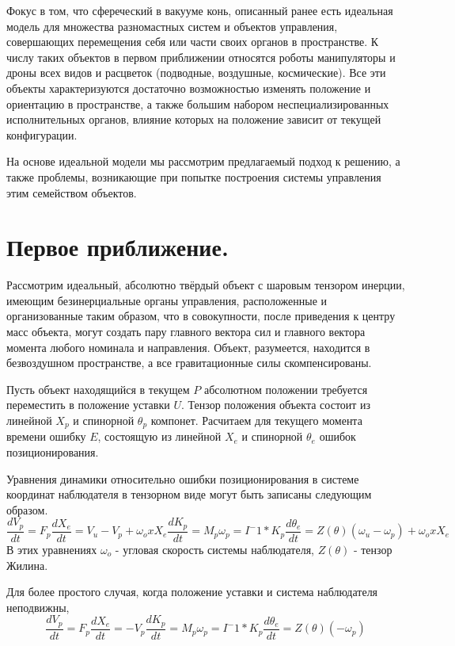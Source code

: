 \documentclass[a4paper]{article}
\begin{document}
Фокус в том, что сфереческий в вакууме конь, описанный ранее есть идеальная модель для множества разномастных систем и объектов управления, совершающих перемещения себя или части своих органов в пространстве. К числу таких объектов в первом приближении относятся роботы манипуляторы и дроны всех видов и расцветок (подводные, воздушные, космические). Все эти объекты характеризуются достаточно возможностью изменять положение и ориентацию в пространстве, а также большим набором неспециализированных исполнительных органов, влияние которых на положение зависит от текущей конфигурации.

На основе идеальной модели мы рассмотрим предлагаемый подход к решению, а также проблемы, возникающие при попытке построения системы управления этим семейством объектов.

\section{Первое приближение.}
Рассмотрим идеальный, абсолютно твёрдый объект с шаровым тензором инерции, имеющим безинерциальные органы управления, расположенные и организованные таким образом, что в совокупности, после приведения к центру масс объекта, могут создать пару главного вектора сил и главного вектора момента любого номинала и направления. Объект, разумеется, находится в безвоздушном пространстве, а все гравитационные силы скомпенсированы.

Пусть объект находящийся в текущем $P$ абсолютном положении требуется переместить в положение уставки $U$.
Тензор положения объекта состоит из линейной $X_p$ и спинорной $\theta_p$ компонет. Расчитаем для текущего момента времени ошибку $E$, состоящую из линейной $X_e$ и спинорной $\theta_e$ ошибок позиционирования.

Уравнения динамики относительно ошибки позиционирования в системе координат наблюдателя в тензорном виде могут быть записаны следующим образом.
\begin{equation}
\frac{dV_p}{dt} = F_p
\frac{dX_e}{dt} = V_u - V_p + \omega_o x X_e

\frac{dK_p}{dt} = M_p
\omega_p = I^-1 * K_p
\frac{d\theta_e}{dt} = Z(\theta)(\omega_u - \omega_p) + \omega_o x X_e
\end{equation}
В этих уравнениях $\omega_o$ - угловая скорость системы наблюдателя, $Z(\theta)$ - тензор Жилина. 

Для более простого случая, когда положение уставки и система наблюдателя неподвижны,   
\begin{equation}
\frac{dV_p}{dt} = F_p
\frac{dX_e}{dt} = - V_p

\frac{dK_p}{dt} = M_p
\omega_p = I^-1 * K_p
\frac{d\theta_e}{dt} = Z(\theta)(- \omega_p)
\end{equation}
\end{document}
